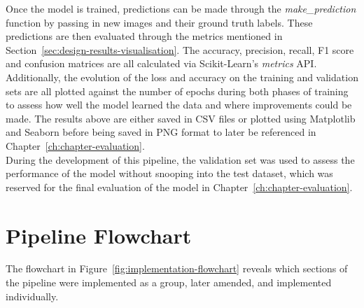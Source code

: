 Once the model is trained, predictions can be made through the \textit{make\_prediction} function by passing in new images and their ground truth labels. These predictions are then evaluated through the metrics mentioned in Section~\ref{sec:design-results-visualisation}. The accuracy, precision, recall, F1 score and confusion matrices are all calculated via Scikit-Learn's \textit{metrics} API. Additionally, the evolution of the loss and accuracy on the training and validation sets are all plotted against the number of epochs during both phases of training to assess how well the model learned the data and where improvements could be made. The results above are either saved in CSV files or plotted using Matplotlib and Seaborn before being saved in PNG format to later be referenced in Chapter~\ref{ch:chapter-evaluation}.\\

During the development of this pipeline, the validation set was used to assess the performance of the model without snooping into the test dataset, which was reserved for the final evaluation of the model in Chapter~\ref{ch:chapter-evaluation}.


\section{Pipeline Flowchart}
\label{sec:implementation-detailed-flowchart}

The flowchart in Figure~\ref{fig:implementation-flowchart} reveals which sections of the pipeline were implemented as a group, later amended, and implemented individually.

